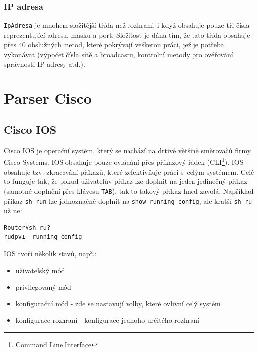 \newpage

\subsubsection{IP adresa}
\verb|IpAdresa| je mnohem složitější třída než rozhraní, i když obsahuje pouze tři čísla reprezentující adresu, masku a port. Složitost je dána tím, že tato třída obsahuje přes 40 obslužných metod, které pokrývají veškerou práci, jež je potřeba vykonávat (výpočet čísla sítě a broadcastu, kontrolní metody pro ověřování správnosti IP adresy atd.).


\section{Parser Cisco}

\subsection{Cisco IOS}
Cisco IOS je operační systém, který se nachází na drtivé většině směrovačů firmy Cisco Systems. IOS obsahuje pouze ovládání přes příkazový řádek (CLI\footnote{Command Line Interface}). IOS obsahuje tzv. zkracování příkazů, které zefektivňuje práci s~celým systémem. Celé to funguje tak, že pokud uživatelův příkaz lze doplnit na jeden jedinečný příkaz (samotné doplnění přes klávesu \verb|TAB|), tak to takový příkaz hned zavolá. Například příkaz \verb|sh run| lze jednoznačně doplnit na \verb|show running-config|, ale kratší \verb|sh ru| už ne:
\begin{verbatim}
Router#sh ru?
rudpv1  running-config
\end{verbatim} 

IOS tvoří několik stavů, např.:
\begin{itemize}
 \item uživatelský mód
 \item privilegovaný mód
 \item konfigurační mód - zde se nastavují volby, které ovlivní celý systém
 \item konfigurace rozhraní - konfigurace jednoho určitého rozhraní
\end{itemize}

